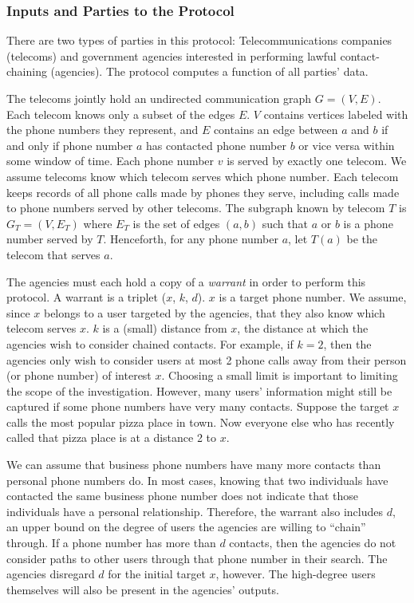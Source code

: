\subsubsection{Inputs and Parties to the Protocol}



There are two types of parties in this protocol: Telecommunications companies (telecoms) and government agencies interested in performing lawful contact-chaining (agencies). The protocol computes a function of all parties' data.



The telecoms jointly hold an undirected communication graph $G=(V,E)$. Each telecom knows only a subset of the edges $E$. $V$ contains vertices labeled with the phone numbers they represent, and $E$ contains an edge between $a$ and $b$ if and only if phone number $a$ has contacted phone number $b$ or vice versa within some window of time. Each phone number $v$ is served by exactly one telecom. We assume telecoms know which telecom serves which phone number. Each telecom keeps records of all phone calls made by phones they serve, including calls made to phone numbers served by other telecoms. The subgraph known by telecom $T$ is $G_T=(V, E_T)$ where $E_T$ is the set of edges $(a, b)$ such that $a$ or $b$ is a phone number served by $T$. Henceforth, for any phone number $a$, let $T(a)$ be the telecom that serves $a$.



The agencies must each hold a copy of a \emph{warrant} in order to perform this protocol. A warrant is a triplet ($x$, $k$, $d$). $x$ is a target phone number. We assume, since $x$ belongs to a user targeted by the agencies, that they also know which telecom serves $x$. $k$ is a (small) distance from $x$, the distance at which the agencies wish to consider chained contacts. For example, if $k=2$, then the agencies only wish to consider users at most 2 phone calls away from their person (or phone number) of interest $x$. Choosing a small limit is important to limiting the scope of the investigation. However, many users' information might still be captured if some phone numbers have very many contacts. Suppose the target $x$ calls the most popular pizza place in town. Now everyone else who has recently called that pizza place is at a distance 2 to $x$.

We can assume that business phone numbers have many more contacts than personal phone numbers do. In most cases, knowing that two individuals have contacted the same business phone number does not indicate that those individuals have a personal relationship. Therefore, the warrant also includes $d$, an upper bound on the degree of users the agencies are willing to ``chain'' through. If a phone number has more than $d$ contacts, then the agencies do not consider paths to other users through that phone number in their search. The agencies disregard $d$ for the initial target $x$, however. The high-degree users themselves will also be present in the agencies' outputs.

